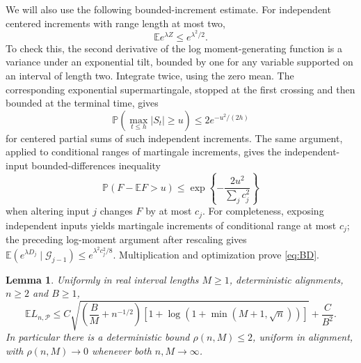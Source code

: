 \documentclass[11pt]{article}
\newtheorem{lemma}[theorem]{Lemma}
\newcommand{\EE}{\mathbb E}
\newcommand{\PP}{\mathbb P}
\newcommand{\cP}{\mathcal P}
\begin{document}
We will also use the following bounded-increment estimate.
For independent centered increments with range length at most two,
\[
       \EE e^{\lambda Z}\leq e^{\lambda^2/2}.
\]
To check this, the second derivative of the log moment-generating
function is a variance under an exponential tilt, bounded by one
for any variable supported on an interval of length two.
Integrate twice, using the zero mean.
The corresponding exponential supermartingale, stopped at the first
crossing and then bounded at the terminal time, gives
\begin{equation}\label{eq:maximal}
 \PP\left(\max_{t\leq h}|S_t|\geq u\right)
             \leq2e^{-u^2/(2h)}
\end{equation}
for centered partial sums of such independent increments.
The same argument, applied to conditional ranges of martingale
increments, gives the independent-input bounded-differences
inequality
\begin{equation}\label{eq:BD}
 \PP(F-\EE F>u)
       \leq\exp\left\{-\frac{2u^2}{\sum_jc_j^2}\right\}
\end{equation}
when altering input $j$ changes $F$ by at most $c_j$.
For completeness, exposing independent inputs yields martingale
increments of conditional range at most $c_j$; the preceding
log-moment argument after rescaling gives
$\EE(e^{\lambda D_j}\mid\mathcal G_{j-1})
 \leq e^{\lambda^2c_j^2/8}$.
Multiplication and optimization prove \eqref{eq:BD}.

\begin{lemma}\label{lem:expectation}
Uniformly in real interval lengths $M\geq1$, deterministic alignments,
$n\geq2$ and $B\geq1$,
\begin{equation}\label{eq:expectation}
 \EE L_{n,\cP}\leq
 C\sqrt{\left(\frac B M+n^{-1/2}\right)
       \left[1+\log(1+\min(M+1,\sqrt n))\right]}+\frac C{B^2}.
\end{equation}
In particular there is a deterministic bound $\rho(n,M)\leq2$,
uniform in alignment, with $\rho(n,M)\to0$ whenever both $n,M\to\infty$.
\end{lemma}
\end{document}

